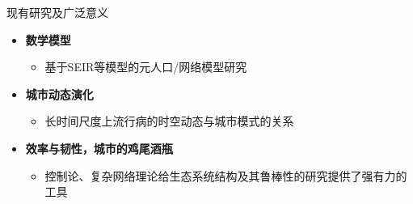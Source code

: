 \begin{frame}{现有研究及广泛意义}
    \begin{itemize}
        \item \textbf{数学模型}
        \begin{itemize}
            \item 基于SEIR等模型的元人口/网络模型研究
        \end{itemize}
        \vspace{0.5cm}
        \item \textbf{城市动态演化}\begin{itemize}
            \item 长时间尺度上流行病的时空动态与城市模式的关系
        \end{itemize}
        \vspace{0.5cm}
        \item \textbf{效率与韧性，城市的鸡尾酒瓶}\begin{itemize}
            \item 控制论、复杂网络理论给生态系统结构及其鲁棒性的研究提供了强有力的工具
        \end{itemize}
    \end{itemize}
\end{frame}